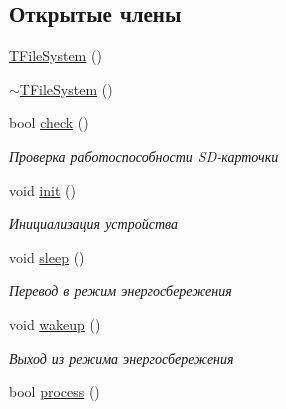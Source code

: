 \subsection*{Открытые члены}
\begin{DoxyCompactItemize}
\item 
\hyperlink{classunit_1_1_t_file_system_ac45162c4d69b6661aab204724af57322}{T\+File\+System} ()
\item 
\hyperlink{classunit_1_1_t_file_system_a87299dbbdea872b06972f1432ef9ef88}{$\sim$\+T\+File\+System} ()
\item 
bool \hyperlink{classunit_1_1_t_file_system_a0737b50d219570ae2e11ea17a32cc85c}{check} ()
\begin{DoxyCompactList}\small\item\em Проверка работоспособности S\+D-\/карточки \end{DoxyCompactList}\item 
\mbox{\label{classunit_1_1_t_file_system_a036085cc2f2674f9ea89426000b6ba02}} 
void \hyperlink{classunit_1_1_t_file_system_a036085cc2f2674f9ea89426000b6ba02}{init} ()
\begin{DoxyCompactList}\small\item\em Инициализация устройства \end{DoxyCompactList}\item 
\mbox{\label{classunit_1_1_t_file_system_a4e4fd801d58a5c6b526a65ec5cb187dd}} 
void \hyperlink{classunit_1_1_t_file_system_a4e4fd801d58a5c6b526a65ec5cb187dd}{sleep} ()
\begin{DoxyCompactList}\small\item\em Перевод в режим энергосбережения \end{DoxyCompactList}\item 
\mbox{\label{classunit_1_1_t_file_system_a99d5e06aee69d3674ea441f140f6a47b}} 
void \hyperlink{classunit_1_1_t_file_system_a99d5e06aee69d3674ea441f140f6a47b}{wakeup} ()
\begin{DoxyCompactList}\small\item\em Выход из режима энергосбережения \end{DoxyCompactList}\item 
\mbox{\label{classunit_1_1_t_file_system_af7969ea11284d9f6f093687f0ba90082}} 
bool \hyperlink{classunit_1_1_t_file_system_af7969ea11284d9f6f093687f0ba90082}{process} ()

\end{DoxyCompactItemize}
